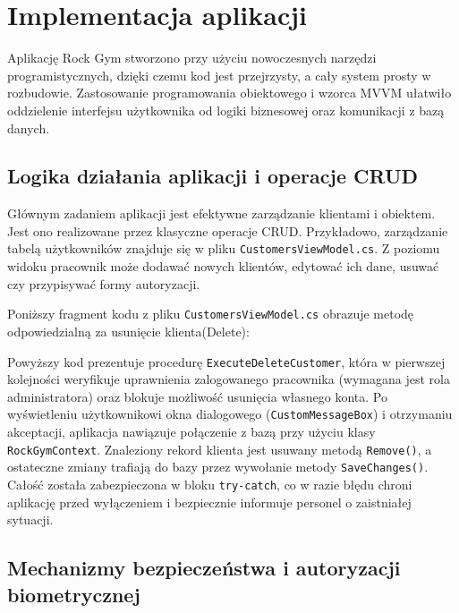 \chapter{Implementacja aplikacji}
\label{ch:implementacja}

Aplikację Rock Gym stworzono przy użyciu nowoczesnych narzędzi programistycznych, dzięki czemu kod jest przejrzysty, a cały system prosty w rozbudowie. Zastosowanie programowania obiektowego i wzorca MVVM ułatwiło oddzielenie interfejsu użytkownika od logiki biznesowej oraz komunikacji z bazą danych.

\section{Logika działania aplikacji i operacje CRUD}

Głównym zadaniem aplikacji jest efektywne zarządzanie klientami i obiektem. Jest ono realizowane przez klasyczne operacje CRUD. Przykładowo, zarządzanie tabelą użytkowników znajduje się w pliku \texttt{CustomersViewModel.cs}. Z poziomu widoku pracownik może dodawać nowych klientów, edytować ich dane, usuwać czy przypisywać formy autoryzacji.

Poniższy fragment kodu z pliku \texttt{CustomersViewModel.cs} obrazuje metodę odpowiedzialną za usunięcie klienta(Delete):



Powyższy kod prezentuje procedurę \texttt{ExecuteDeleteCustomer}, która w pierwszej kolejności weryfikuje uprawnienia zalogowanego pracownika (wymagana jest rola administratora) oraz blokuje możliwość usunięcia własnego konta. Po wyświetleniu użytkownikowi okna dialogowego (\texttt{CustomMessageBox}) i otrzymaniu akceptacji, aplikacja nawiązuje połączenie z bazą przy użyciu klasy \texttt{RockGymContext}. Znaleziony rekord klienta jest usuwany metodą \texttt{Remove()}, a ostateczne zmiany trafiają do bazy przez wywołanie metody \texttt{SaveChanges()}. Całość została zabezpieczona w bloku \texttt{try-catch}, co w razie błędu chroni aplikację przed wyłączeniem i bezpiecznie informuje personel o zaistniałej sytuacji.

\section{Mechanizmy bezpieczeństwa i autoryzacji biometrycznej}

